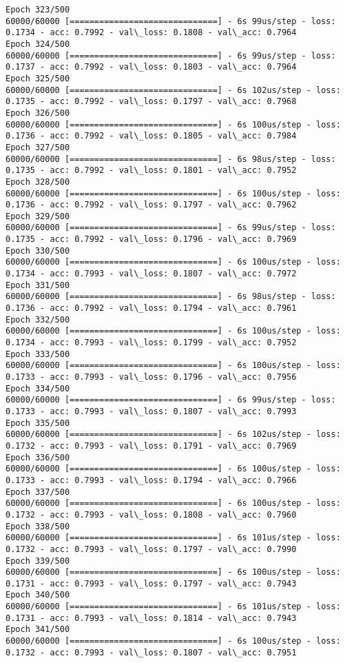 \documentclass[11pt]{article}
\begin{document}
\begin{Verbatim}[commandchars=\\\{\}]
Epoch 323/500
60000/60000 [==============================] - 6s 99us/step - loss: 0.1734 - acc: 0.7992 - val\_loss: 0.1808 - val\_acc: 0.7964
Epoch 324/500
60000/60000 [==============================] - 6s 99us/step - loss: 0.1737 - acc: 0.7992 - val\_loss: 0.1803 - val\_acc: 0.7964
Epoch 325/500
60000/60000 [==============================] - 6s 102us/step - loss: 0.1735 - acc: 0.7992 - val\_loss: 0.1797 - val\_acc: 0.7968
Epoch 326/500
60000/60000 [==============================] - 6s 100us/step - loss: 0.1736 - acc: 0.7992 - val\_loss: 0.1805 - val\_acc: 0.7984
Epoch 327/500
60000/60000 [==============================] - 6s 98us/step - loss: 0.1735 - acc: 0.7992 - val\_loss: 0.1801 - val\_acc: 0.7952
Epoch 328/500
60000/60000 [==============================] - 6s 100us/step - loss: 0.1736 - acc: 0.7992 - val\_loss: 0.1797 - val\_acc: 0.7962
Epoch 329/500
60000/60000 [==============================] - 6s 99us/step - loss: 0.1735 - acc: 0.7992 - val\_loss: 0.1796 - val\_acc: 0.7969
Epoch 330/500
60000/60000 [==============================] - 6s 100us/step - loss: 0.1734 - acc: 0.7993 - val\_loss: 0.1807 - val\_acc: 0.7972
Epoch 331/500
60000/60000 [==============================] - 6s 98us/step - loss: 0.1736 - acc: 0.7992 - val\_loss: 0.1794 - val\_acc: 0.7961
Epoch 332/500
60000/60000 [==============================] - 6s 100us/step - loss: 0.1734 - acc: 0.7993 - val\_loss: 0.1799 - val\_acc: 0.7952
Epoch 333/500
60000/60000 [==============================] - 6s 100us/step - loss: 0.1733 - acc: 0.7993 - val\_loss: 0.1796 - val\_acc: 0.7956
Epoch 334/500
60000/60000 [==============================] - 6s 99us/step - loss: 0.1733 - acc: 0.7993 - val\_loss: 0.1807 - val\_acc: 0.7993
Epoch 335/500
60000/60000 [==============================] - 6s 102us/step - loss: 0.1732 - acc: 0.7993 - val\_loss: 0.1791 - val\_acc: 0.7969
Epoch 336/500
60000/60000 [==============================] - 6s 100us/step - loss: 0.1733 - acc: 0.7993 - val\_loss: 0.1794 - val\_acc: 0.7966
Epoch 337/500
60000/60000 [==============================] - 6s 100us/step - loss: 0.1732 - acc: 0.7993 - val\_loss: 0.1808 - val\_acc: 0.7960
Epoch 338/500
60000/60000 [==============================] - 6s 101us/step - loss: 0.1732 - acc: 0.7993 - val\_loss: 0.1797 - val\_acc: 0.7990
Epoch 339/500
60000/60000 [==============================] - 6s 100us/step - loss: 0.1731 - acc: 0.7993 - val\_loss: 0.1797 - val\_acc: 0.7943
Epoch 340/500
60000/60000 [==============================] - 6s 101us/step - loss: 0.1731 - acc: 0.7993 - val\_loss: 0.1814 - val\_acc: 0.7943
Epoch 341/500
60000/60000 [==============================] - 6s 100us/step - loss: 0.1732 - acc: 0.7993 - val\_loss: 0.1807 - val\_acc: 0.7951

\end{Verbatim}
\end{document}
